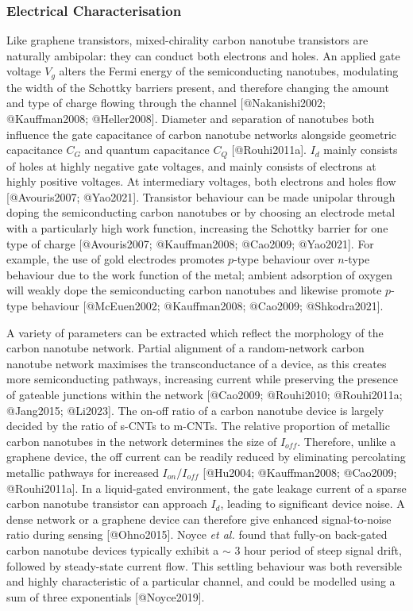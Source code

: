 \documentclass[
  letterpaper,
  DIV=11,
  numbers=noendperiod]{scrartcl}
\begin{document}
\subsubsection{Electrical
Characterisation}\label{sec-electrical-characterisation-CNT}

Like graphene transistors, mixed-chirality carbon nanotube transistors
are naturally ambipolar: they can conduct both electrons and holes. An
applied gate voltage \(V_g\) alters the Fermi energy of the
semiconducting nanotubes, modulating the width of the Schottky barriers
present, and therefore changing the amount and type of charge flowing
through the channel {[}@Nakanishi2002; @Kauffman2008; @Heller2008{]}.
Diameter and separation of nanotubes both influence the gate capacitance
of carbon nanotube networks alongside geometric capacitance \(C_{G}\)
and quantum capacitance \(C_{Q}\) {[}@Rouhi2011a{]}. \(I_d\) mainly
consists of holes at highly negative gate voltages, and mainly consists
of electrons at highly positive voltages. At intermediary voltages, both
electrons and holes flow {[}@Avouris2007; @Yao2021{]}. Transistor
behaviour can be made unipolar through doping the semiconducting carbon
nanotubes or by choosing an electrode metal with a particularly high
work function, increasing the Schottky barrier for one type of charge
{[}@Avouris2007; @Kauffman2008; @Cao2009; @Yao2021{]}. For example, the
use of gold electrodes promotes \(p\)-type behaviour over \(n\)-type
behaviour due to the work function of the metal; ambient adsorption of
oxygen will weakly dope the semiconducting carbon nanotubes and likewise
promote \(p\)-type behaviour {[}@McEuen2002; @Kauffman2008; @Cao2009;
@Shkodra2021{]}.

A variety of parameters can be extracted which reflect the morphology of
the carbon nanotube network. Partial alignment of a random-network
carbon nanotube network maximises the transconductance of a device, as
this creates more semiconducting pathways, increasing current while
preserving the presence of gateable junctions within the network
{[}@Cao2009; @Rouhi2010; @Rouhi2011a; @Jang2015; @Li2023{]}. The on-off
ratio of a carbon nanotube device is largely decided by the ratio of
s-CNTs to m-CNTs. The relative proportion of metallic carbon nanotubes
in the network determines the size of \(I_{off}\). Therefore, unlike a
graphene device, the off current can be readily reduced by eliminating
percolating metallic pathways for increased \(I_{on}/I_{off}\)
{[}@Hu2004; @Kauffman2008; @Cao2009; @Rouhi2011a{]}. In a liquid-gated
environment, the gate leakage current of a sparse carbon nanotube
transistor can approach \(I_d\), leading to significant device noise. A
dense network or a graphene device can therefore give enhanced
signal-to-noise ratio during sensing {[}@Ohno2015{]}. Noyce \emph{et
al.} found that fully-on back-gated carbon nanotube devices typically
exhibit a \(\sim\) 3 hour period of steep signal drift, followed by
steady-state current flow. This settling behaviour was both reversible
and highly characteristic of a particular channel, and could be modelled
using a sum of three exponentials {[}@Noyce2019{]}.
\end{document}
